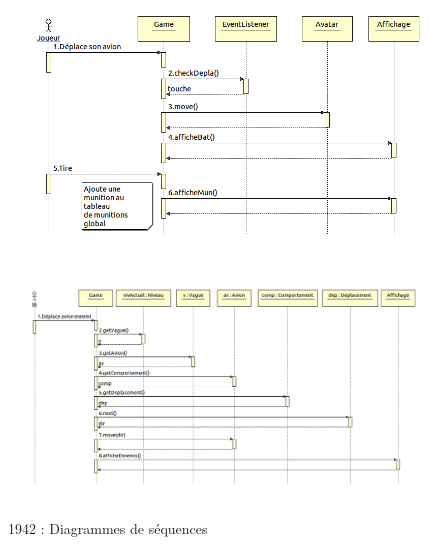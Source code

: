 \begin{figure}[h]
 \centering
 \includegraphics[height=8cm]{../umls/UML_images/Bat42/sequence} \hfill
 \includegraphics[width=\textwidth]{../umls/UML_images/Bat42/sequenceIA} \hfill
 \caption{1942 : Diagrammes de séquences}
\end{figure}

\clearpage

